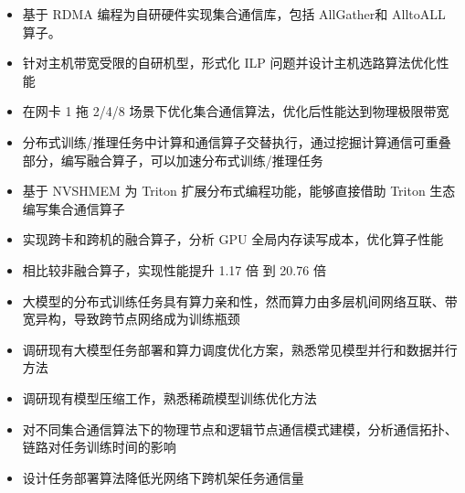 \documentclass{resume}
\begin{document}
\begin{itemize}[parsep=0.5ex]
  \item 基于 RDMA 编程为自研硬件实现集合通信库，包括 AllGather和 AlltoALL 算子。
  \item 针对主机带宽受限的自研机型，形式化 ILP 问题并设计主机选路算法优化性能
  \item 在网卡 1 拖 2/4/8 场景下优化集合通信算法，优化后性能达到物理极限带宽
\end{itemize}

\begin{itemize}[parsep=0.5ex]
  \item 分布式训练/推理任务中计算和通信算子交替执行，通过挖掘计算通信可重叠部分，编写融合算子，可以加速分布式训练/推理任务
  \item 基于 NVSHMEM 为 Triton 扩展分布式编程功能，能够直接借助 Triton 生态编写集合通信算子
  \item 实现跨卡和跨机的融合算子，分析 GPU 全局内存读写成本，优化算子性能
  \item 相比较非融合算子，实现性能提升 1.17 倍 到 20.76 倍
\end{itemize}

\begin{itemize}[parsep=0.5ex]
  \item 大模型的分布式训练任务具有算力亲和性，然而算力由多层机间网络互联、带宽异构，导致跨节点网络成为训练瓶颈
  \item 调研现有大模型任务部署和算力调度优化方案，熟悉常见模型并行和数据并行方法
  \item 调研现有模型压缩工作，熟悉稀疏模型训练优化方法
  \item 对不同集合通信算法下的物理节点和逻辑节点通信模式建模，分析通信拓扑、链路对任务训练时间的影响
  \item 设计任务部署算法降低光网络下跨机架任务通信量
\end{itemize}

\end{document}
